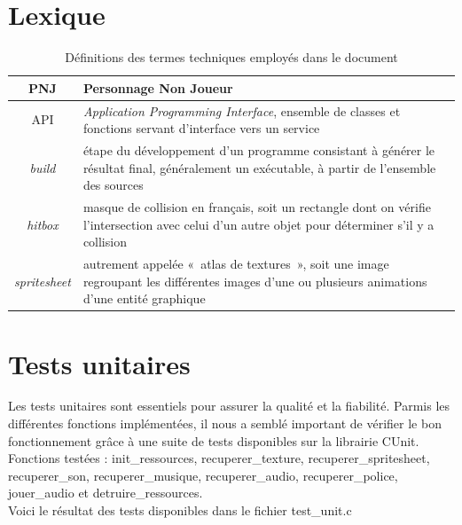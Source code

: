 \documentclass[a4paper,12pt]{article}
\begin{document}
\newpage
\begin{appendices}

\section{Lexique}

\begin{table}[h]
    \centering
    \begin{tabular}{c p{}}
	\toprule
        PNJ \label{def_pnj} & Personnage Non Joueur \\
	\midrule
	API \label{def_api} & \textit{Application Programming Interface}, ensemble de classes et fonctions servant d’interface vers un service \\
	\midrule
        \textit{build} \label{def_build} & étape du développement d’un programme consistant à générer le résultat final, généralement un exécutable, à partir de l’ensemble des sources \\
	\midrule
        \textit{hitbox} \label{def_hitbox} & masque de collision en français, soit un rectangle dont on vérifie l’intersection avec celui d’un autre objet pour déterminer s’il y a collision\\
	\midrule
        \textit{spritesheet} \label{def_spritesheet} & autrement appelée « atlas de textures », soit une image regroupant les différentes images d’une ou plusieurs animations d’une entité graphique \\
	\bottomrule
    \end{tabular}
    \caption{Définitions des termes techniques employés dans le document}
\end{table}



\section{Tests unitaires}
Les tests unitaires sont essentiels pour assurer la qualité et la fiabilité. Parmis les différentes fonctions implémentées, il nous a semblé important de vérifier le bon fonctionnement grâce à une suite de tests disponibles sur la librairie CUnit.\\
Fonctions testées : init\_ressources, recuperer\_texture, recuperer\_spritesheet, recuperer\_son, recuperer\_musique, recuperer\_audio, recuperer\_police, jouer\_audio et detruire\_ressources.\\
Voici le résultat des tests disponibles dans le fichier test\_unit.c\\


\end{appendices}
\end{document}
